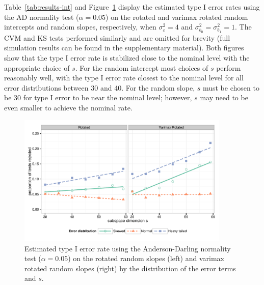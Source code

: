 \documentclass[12pt]{article} %
\begin{document}
Table~\ref{tab:results-int} and Figure~\ref{fig:results-slope} display the estimated type I error rates using the AD normality test ($\alpha = 0.05$) on the rotated and varimax rotated random intercepts and random slopes, respectively, when $\sigma^2_\varepsilon = 4$ and $\sigma^2_{b_0} = \sigma^2_{b_1} = 1$. The CVM and KS tests performed similarly and are omitted for brevity (full simulation results can be found in the supplementary material). Both figures show that the type I error rate is stabilized close to the nominal level with the appropriate choice of $s$. For the random intercept most choices of $s$ perform reasonably well, with the type I error rate closest to the nominal level for all error distributions between 30 and 40. For the random slope, $s$ must be chosen to be 30 for type I error to be near the nominal level; however, $s$ may need to be even smaller to achieve the nominal rate. 


\begin{figure}[h]
	\centering
	\includegraphics[width=0.9\textwidth]{ad_slope_results.pdf}
	\caption{\label{fig:results-slope} Estimated type I error rate using the Anderson-Darling normality test ($\alpha = 0.05$) on the rotated random slopes (left) and varimax rotated random slopes (right) by the distribution of the error terms and $s$.}
\end{figure}
\end{document}
